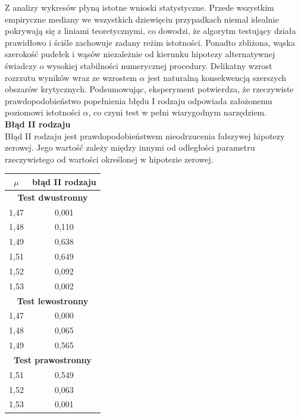\documentclass[12pt, a4paper]{article}
\begin{document}
	Z analizy wykresów płyną istotne wnioski statystyczne. Przede wszystkim empiryczne mediany we wszystkich dziewięciu przypadkach niemal idealnie pokrywają się z liniami teoretycznymi, co dowodzi, że algorytm testujący działa prawidłowo i ściśle zachowuje zadany reżim istotności. Ponadto zbliżona, wąska szerokość pudełek i wąsów niezależnie od kierunku hipotezy alternatywnej świadczy o wysokiej stabilności numerycznej procedury. Delikatny wzrost rozrzutu wyników wraz ze wzrostem $\alpha$ jest naturalną konsekwencją szerszych obszarów krytycznych. Podsumowując, eksperyment potwierdza, że rzeczywiste prawdopodobieństwo popełnienia błędu I rodzaju odpowiada założonemu poziomowi istotności $\alpha$, co czyni test w pełni wiarygodnym narzędziem. \\
		\newpage
		\textbf{Błąd II rodzaju} \\
		Błąd II rodzaju jest prawdopodobieństwem nieodrzucenia fałszywej hipotezy zerowej. Jego wartość zależy między innymi od odległości parametru rzeczywistego od wartości określonej w hipotezie zerowej. \\
		
		\begin{table}[htbp]
			\centering
			\begin{tabular}{|c|c|}
				\hline
				$\mu$ & błąd II rodzaju \\ \hline
				\multicolumn{2}{|c|}{\textbf{Test dwustronny}} \\ \hline
				1,47 & 0,001 \\ \hline
				1,48 & 0,110 \\ \hline
				1,49 & 0,638 \\ \hline
				1,51 & 0,649 \\ \hline
				1,52 & 0,092 \\ \hline
				1,53 & 0,002 \\ \hline
				\multicolumn{2}{|c|}{\textbf{Test lewostronny}} \\ \hline
				1,47 & 0,000 \\ \hline
				1,48 & 0,065 \\ \hline
				1,49 & 0,565 \\ \hline
				\multicolumn{2}{|c|}{\textbf{Test prawostronny}} \\ \hline
				1,51 & 0,549 \\ \hline
				1,52 & 0,063 \\ \hline
				1,53 & 0,001 \\ \hline
			\end{tabular}
		\end{table}
		
\end{document}

